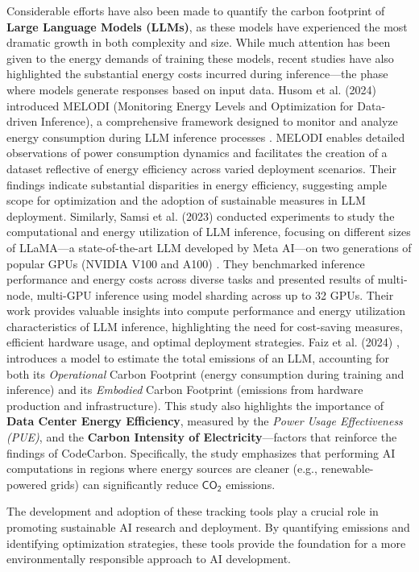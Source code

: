 \documentclass[a4paper,singleside,12pt]{report} %
\begin{document}
Considerable efforts have also been made to quantify the carbon footprint of \textbf{Large Language Models (LLMs)}, as these 
models have experienced the most dramatic growth in both complexity and size. While much attention has been given to the energy 
demands of training these models, recent studies have also highlighted the substantial energy costs incurred during inference—the 
phase where models generate responses based on input data. Husom et al. (2024) introduced MELODI (Monitoring Energy Levels and 
Optimization for Data-driven Inference), a comprehensive framework designed to monitor and analyze energy consumption during LLM 
inference processes \cite{husom2024priceprompting}. MELODI enables detailed observations of power consumption dynamics and 
facilitates the creation of a dataset reflective of energy efficiency across varied deployment scenarios. Their findings indicate 
substantial disparities in energy efficiency, suggesting ample scope for optimization and the adoption of sustainable measures 
in LLM deployment. Similarly, Samsi et al. (2023) conducted experiments to study the computational and energy utilization of 
LLM inference, focusing on different sizes of LLaMA—a state-of-the-art LLM developed by Meta AI—on two generations of popular 
GPUs (NVIDIA V100 and A100) \cite{samsi2023wordswattsbenchmarkingenergy}. They benchmarked inference performance and energy 
costs across diverse tasks and presented results of multi-node, multi-GPU inference using model sharding across up to 32 GPUs. 
Their work provides valuable insights into compute performance and energy utilization characteristics of LLM inference, 
highlighting the need for cost-saving measures, efficient hardware usage, and optimal deployment strategies. Faiz et al. (2024) 
\cite{faiz2024llmcarbon}, introduces a model to estimate the total emissions of an LLM, accounting for both its \textit{Operational} 
Carbon Footprint (energy consumption during training and inference) and its \textit{Embodied} Carbon Footprint (emissions from 
hardware production and infrastructure). This study also highlights the importance of \textbf{Data Center Energy Efficiency}, 
measured by the \textit{Power Usage Effectiveness (PUE)}, and the \textbf{Carbon Intensity of Electricity}—factors that reinforce 
the findings of CodeCarbon. Specifically, the study emphasizes that performing AI computations in regions where energy sources 
are cleaner (e.g., renewable-powered grids) can significantly reduce $\mathsf{CO_2}$ emissions. 

The development and adoption of these tracking tools play a crucial role in promoting sustainable AI research and deployment. 
By quantifying emissions and identifying optimization strategies, these tools provide the foundation for a more environmentally 
responsible approach to AI development.
 
\end{document}
